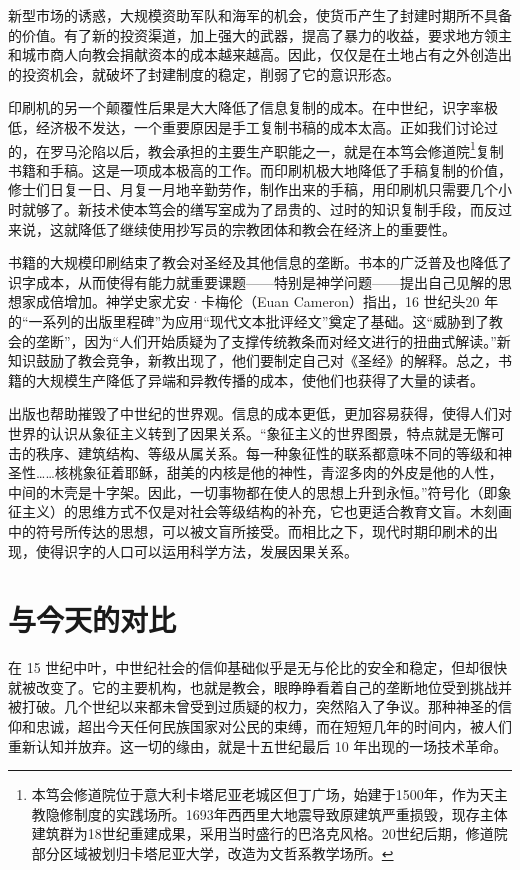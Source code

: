 新型市场的诱惑，大规模资助军队和海军的机会，使货币产生了封建时期所不具备的价值。有了新的投资渠道，加上强大的武器，提高了暴力的收益，要求地方领主和城市商人向教会捐献资本的成本越来越高。因此，仅仅是在土地占有之外创造出的投资机会，就破坏了封建制度的稳定，削弱了它的意识形态。

印刷机的另一个颠覆性后果是大大降低了信息复制的成本。在中世纪，识字率极低，经济极不发达，一个重要原因是手工复制书稿的成本太高。正如我们讨论过的，在罗马沦陷以后，教会承担的主要生产职能之一，就是在本笃会修道院\footnote{本笃会修道院位于意大利卡塔尼亚老城区但丁广场，始建于1500年，作为天主教隐修制度的实践场所。1693年西西里大地震导致原建筑严重损毁，现存主体建筑群为18世纪重建成果，采用当时盛行的巴洛克风格。20世纪后期，修道院部分区域被划归卡塔尼亚大学，改造为文哲系教学场所。}复制书籍和手稿。这是一项成本极高的工作。而印刷机极大地降低了手稿复制的价值，修士们日复一日、月复一月地辛勤劳作，制作出来的手稿，用印刷机只需要几个小时就够了。新技术使本笃会的缮写室成为了昂贵的、过时的知识复制手段，而反过来说，这就降低了继续使用抄写员的宗教团体和教会在经济上的重要性。

书籍的大规模印刷结束了教会对圣经及其他信息的垄断。书本的广泛普及也降低了识字成本，从而使得有能力就重要课题——特别是神学问题——提出自己见解的思想家成倍增加。神学史家尤安·卡梅伦（Euan Cameron）指出，16 世纪头20 年的“一系列的出版里程碑”为应用“现代文本批评经文”奠定了基础。这“威胁到了教会的垄断”，因为“人们开始质疑为了支撑传统教条而对经文进行的扭曲式解读。”新知识鼓励了教会竞争，新教出现了，他们要制定自己对《圣经》的解释。总之，书籍的大规模生产降低了异端和异教传播的成本，使他们也获得了大量的读者。

出版也帮助摧毁了中世纪的世界观。信息的成本更低，更加容易获得，使得人们对世界的认识从象征主义转到了因果关系。“象征主义的世界图景，特点就是无懈可击的秩序、建筑结构、等级从属关系。每一种象征性的联系都意味不同的等级和神圣性……核桃象征着耶稣，甜美的内核是他的神性，青涩多肉的外皮是他的人性，中间的木壳是十字架。因此，一切事物都在使人的思想上升到永恒。”符号化（即象征主义）的思维方式不仅是对社会等级结构的补充，它也更适合教育文盲。木刻画中的符号所传达的思想，可以被文盲所接受。而相比之下，现代时期印刷术的出现，使得识字的人口可以运用科学方法，发展因果关系。

\section{与今天的对比}
在 15 世纪中叶，中世纪社会的信仰基础似乎是无与伦比的安全和稳定，但却很快就被改变了。它的主要机构，也就是教会，眼睁睁看着自己的垄断地位受到挑战并被打破。几个世纪以来都未曾受到过质疑的权力，突然陷入了争议。那种神圣的信仰和忠诚，超出今天任何民族国家对公民的束缚，而在短短几年的时间内，被人们重新认知并放弃。这一切的缘由，就是十五世纪最后 10 年出现的一场技术革命。

